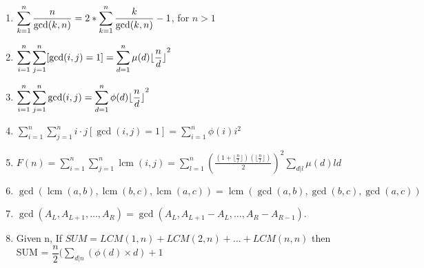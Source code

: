 \begin{enumerate}[resume]
    \item $\displaystyle \displaystyle \sum_{k=1}^n \frac{n}{\gcd(k, n)} = 2 * \displaystyle \sum_{k=1}^n \frac{k}{\gcd(k, n)} - 1$, for $n > 1$
    \item $\displaystyle \displaystyle \sum_{i=1}^n \sum_{j=1}^n [\gcd(i, j) = 1] = \displaystyle \sum_{d=1}^n \mu(d) \lfloor {\frac{n}{d} \rfloor}^2$
    \item $\displaystyle \displaystyle \sum_{i=1}^n \displaystyle\sum_{j=1}^n \gcd(i, j) = \displaystyle \sum_{d=1}^n \phi(d) \lfloor {\frac{n}{d} \rfloor}^2$
    \item $\displaystyle \sum_{i=1}^n \sum_{j=1}^n i \cdot j[\gcd(i, j) = 1] = \sum_{i=1}^n \phi(i)i^2$
    \item $\displaystyle F(n) = \displaystyle \sum_{i=1}^n \displaystyle \sum_{j=1}^n \operatorname{lcm}(i, j) = \displaystyle \sum_{l=1}^n {\left(\frac{\left( 1 + \lfloor{\frac{n}{l} \rfloor} \right) \left( \lfloor{\frac{n}{l} \rfloor} \right)} {2} \right)}^2 \displaystyle \sum_{d|l} \mu(d)ld$
    \item $\displaystyle \gcd(\operatorname{lcm}(a, b), \operatorname{lcm}(b, c), \operatorname{lcm}(a, c)) = \operatorname{lcm}(\gcd(a, b), \gcd(b, c), \gcd(a, c))$
    \item $\displaystyle \gcd(A_L, A_{L+1}, \dots, A_R) = \gcd(A_L, A_{L+1} - A_L, \dots, A_R - A_{R-1})$.
    \item Given n, If $SUM = LCM(1,n) + LCM(2,n) + \dots + LCM(n,n)$
          then SUM = $\displaystyle \dfrac{n}{2}( \displaystyle\sum _{ d| n}\left( \phi \left( d\right) \times d\right) +1$
\end{enumerate}
